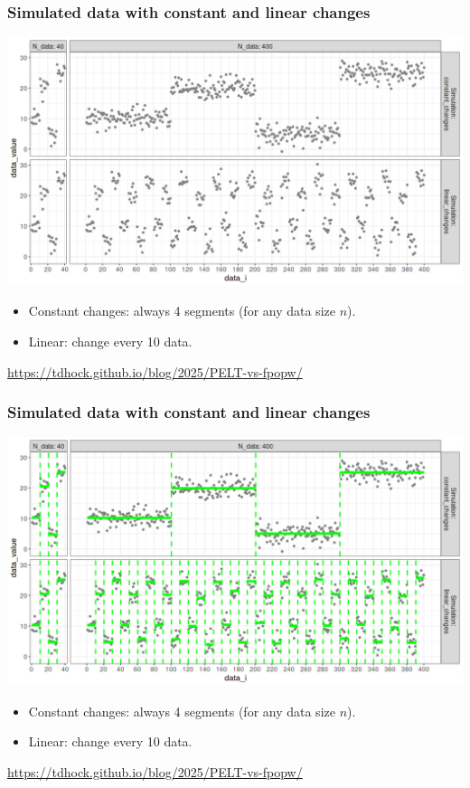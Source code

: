 \documentclass{beamer}
\begin{document}
\begin{frame}
  \frametitle{Simulated data with constant and linear changes}
  \includegraphics[width=\textwidth]{figure-sim-linear-constant-changes.png}

  \begin{itemize}
  \item Constant changes: always 4 segments (for any data size $n$).
  \item Linear: change every 10 data.
  \end{itemize}
  
  \url{https://tdhock.github.io/blog/2025/PELT-vs-fpopw/}
\end{frame}

\begin{frame}
  \frametitle{Simulated data with constant and linear changes}
  \includegraphics[width=\textwidth]{figure-sim-linear-constant-changes-model.png}

  \begin{itemize}
  \item Constant changes: always 4 segments (for any data size $n$).
  \item Linear: change every 10 data.
  \end{itemize}
  
  \url{https://tdhock.github.io/blog/2025/PELT-vs-fpopw/}
\end{frame}
\end{document}
